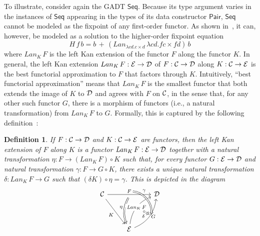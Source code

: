 \documentclass[submission,copyright,creativecommons]{eptcs}
\newtheorem{definition}[thm]{Definition}
\begin{document}
To illustrate, consider again the GADT $\mathsf{Seq}$. Because its
type argument varies in the instances of $\mathsf{Seq}$ appearing in
the types of its data constructor $\mathsf{Pair}$, $\mathsf{Seq}$
cannot be modeled as the fixpoint of any first-order functor. As shown
in~\cite{jp19}, it can, however, be modeled as a solution to the
higher-order fixpoint equation
\[H\,f\,b = b \,+\,(Lan_{\lambda c d. c \times d}\, \lambda
c d. f c \times f d)\,b\] where $Lan_K \,F$ is the left Kan extension
of the functor $F$ along the functor $K$. In general, the left Kan
extension $Lan_K \,F : {\cal E} \to {\cal D}$ of $F : {\cal C} \to
{\cal D}$ along $K : {\cal C} \to {\cal E}$ is the best functorial
approximation to $F$ that factors through $K$. Intuitively, ``best functorial
approximation'' means that $Lan_K \,F$ is the smallest functor that
both extends the image of $K$ to $\cal D$ and agrees with $F$ on $\cal
C$, in the sense that, for any other such functor $G$, there is a
morphism of functors (i.e., a natural transformation) from $Lan_K \,F$
to $G$. Formally, this is captured by the following
definition~\cite{mac71}:
\begin{definition}\label{def:lke}
If $F : {\cal C} \to {\cal D}$ and $K : {\cal C} \to {\cal E}$ are
functors, then the {\em left Kan extension of $F$ along $K$} is a
functor $\mathit{Lan}_K\,F : {\cal E} \to {\cal D}$ together with a
natural transformation $\eta : F \to (\mathit{Lan}_K\,F) \circ K$ such
that, for every functor $G : {\cal E} \to {\cal D}$ and natural
transformation $\gamma : F \to G \circ K$, there exists a unique
natural transformation $\delta : \mathit{Lan}_K\,F \to G$ such that
$(\delta K) \circ \eta = \gamma$. This is depicted in the diagram
\[\begin{tikzcd}[row sep = huge]
{\cal C}
\ar[rr, "{F}"{name=Fa, above}, ""{name=F, below}]
\ar[rd, "{K}"']
&& {\cal D} \\
& {\cal E}
\ar[Rightarrow, bend right = 25, from=F, "{\eta}"']
\ar[ur, bend left, "{\mathit{Lan}_{K}\,F}"{name=Lan, description}]
\ar[ur, bend right, "{G}"'{name=L, right}, ""'{name=Lr, right}]
\ar[Rightarrow, bend left = 45, from=Fa, to=Lr, "{\gamma}" near start]
\ar[Rightarrow, dashed, from=Lan, to=L, "{\delta}"']
\end{tikzcd}\]
\end{definition}
\end{document}
